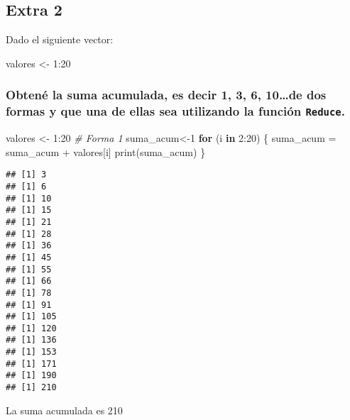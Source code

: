 \documentclass[
]{article}
\newenvironment{Shaded}{\begin{snugshade}}{\end{snugshade}}
\newcommand{\CommentTok}[1]{\textcolor[rgb]{0.56,0.35,0.01}{\textit{#1}}}
\newcommand{\ControlFlowTok}[1]{\textcolor[rgb]{0.13,0.29,0.53}{\textbf{#1}}}
\newcommand{\DecValTok}[1]{\textcolor[rgb]{0.00,0.00,0.81}{#1}}
\newcommand{\FunctionTok}[1]{\textcolor[rgb]{0.00,0.00,0.00}{#1}}
\newcommand{\NormalTok}[1]{#1}
\newcommand{\OtherTok}[1]{\textcolor[rgb]{0.56,0.35,0.01}{#1}}
\newcommand{\SpecialCharTok}[1]{\textcolor[rgb]{0.00,0.00,0.00}{#1}}
\begin{document}
\hypertarget{extra-2}{%
\subsection{Extra 2}\label{extra-2}}

Dado el siguiente vector:

\begin{Shaded}
\begin{Highlighting}[]
\NormalTok{valores }\OtherTok{\textless{}{-}} \DecValTok{1}\SpecialCharTok{:}\DecValTok{20}
\end{Highlighting}
\end{Shaded}

\hypertarget{obtenuxe9-la-suma-acumulada-es-decir-1-3-6-10de-dos-formas-y-que-una-de-ellas-sea-utilizando-la-funciuxf3n-reduce.}{%
\subsubsection{\texorpdfstring{Obtené la suma acumulada, es decir 1, 3,
6, 10\ldots de dos formas y que una de ellas sea utilizando la función
\texttt{Reduce}.}{Obtené la suma acumulada, es decir 1, 3, 6, 10\ldots de dos formas y que una de ellas sea utilizando la función Reduce.}}\label{obtenuxe9-la-suma-acumulada-es-decir-1-3-6-10de-dos-formas-y-que-una-de-ellas-sea-utilizando-la-funciuxf3n-reduce.}}

\begin{Shaded}
\begin{Highlighting}[]
\NormalTok{valores }\OtherTok{\textless{}{-}} \DecValTok{1}\SpecialCharTok{:}\DecValTok{20}
\CommentTok{\# Forma 1}
\NormalTok{suma\_acum}\OtherTok{\textless{}{-}}\DecValTok{1}
\ControlFlowTok{for}\NormalTok{ (i }\ControlFlowTok{in} \DecValTok{2}\SpecialCharTok{:}\DecValTok{20}\NormalTok{) \{}
\NormalTok{  suma\_acum }\OtherTok{=}\NormalTok{ suma\_acum }\SpecialCharTok{+}\NormalTok{ valores[i]}
  \FunctionTok{print}\NormalTok{(suma\_acum)}
\NormalTok{\}}
\end{Highlighting}
\end{Shaded}

\begin{verbatim}
## [1] 3
## [1] 6
## [1] 10
## [1] 15
## [1] 21
## [1] 28
## [1] 36
## [1] 45
## [1] 55
## [1] 66
## [1] 78
## [1] 91
## [1] 105
## [1] 120
## [1] 136
## [1] 153
## [1] 171
## [1] 190
## [1] 210
\end{verbatim}

La suma acumulada es 210
\end{document}
